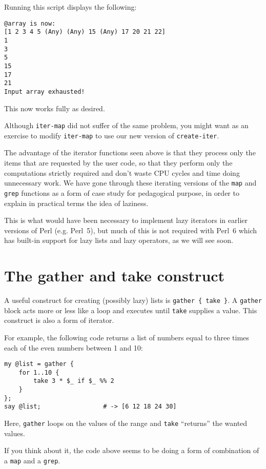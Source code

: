 Running this script displays the following:
\begin{verbatim}
@array is now:
[1 2 3 4 5 (Any) (Any) 15 (Any) 17 20 21 22]
1
3
5
15
17
21
Input array exhausted!
\end{verbatim}

This now works fully as desired.

Although {\tt iter-map} did not suffer of the same problem, 
you might want as an exercise to modify {\tt iter-map}
to use our new version of {\tt create-iter}.

The advantage of the iterator functions seen above is that they 
process only the items that are requested by the user code, so 
that they perform only the computations strictly required and 
don't waste CPU cycles and time doing unnecessary work. We have 
gone through these iterating versions of the {\tt map} 
and {\tt grep} functions as a form of case study for 
pedagogical purpose, in order to explain in practical terms 
the idea of laziness. 

This is what would have been necessary to implement lazy 
iterators in earlier versions of Perl (e.g. Perl~5), but 
much of this is not required with Perl~6 which has built-in 
support for lazy lists and lazy operators, as we will see soon.

\section{The gather and take construct}

A useful construct for creating (possibly lazy) lists 
is  \verb'gather { take }'. A \verb'gather' block 
acts more or less like a loop and executes until 
\verb'take' supplies a value. This construct is also 
a form of iterator.

For example, the following code returns a list of 
numbers equal to three times each of the even numbers 
between 1 and 10:

\begin{verbatim}
my @list = gather { 
    for 1..10 {
        take 3 * $_ if $_ %% 2
    } 
};
say @list;                 # -> [6 12 18 24 30]
\end{verbatim}

Here, \verb'gather' loops on the values of the range 
and {\tt take} ``returns'' the wanted values.

If you think about it, the code above seems to 
be doing a form of combination of a {\tt map} and a 
{\tt grep}.

